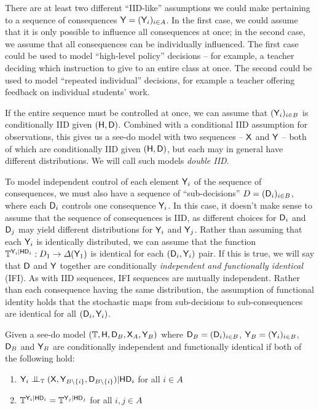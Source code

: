There are at least two different ``IID-like'' assumptions we could make pertaining to a sequence of consequences $\mathsf{Y}=(\mathsf{Y}_i)_{i\in A}$. In the first case, we could assume that it is only possible to influence all consequences at once; in the second case, we assume that all consequences can be individually influenced. The first case could be used to model ``high-level policy'' decisions -- for example, a teacher deciding which instruction to give to an entire class at once. The second could be used to model ``repeated individual'' decisions, for example a teacher offering feedback on individual students' work.

If the entire sequence must be controlled at once, we can assume that $(\mathsf{Y}_i)_{i\in B}$ is conditionally IID given $(\mathsf{H},\mathsf{D})$. Combined with a conditional IID assumption for observations, this gives us a see-do model with two sequences -- $\mathsf{X}$ and $\mathsf{Y}$ -- both of which are conditionally IID given $(\mathsf{H},\mathsf{D})$, but each may in general have different distributions. We will call such models \emph{double IID}.

To model independent control of each element $\mathsf{Y}_i$ of the sequence of consequences, we must also have a sequence of ``sub-decisions'' $D=(\mathsf{D}_i)_{i\in B}$, where each $\mathsf{D}_i$ controls one consequence $\mathsf{Y}_i$. In this case, it doesn't make sense to assume that the sequence of consequences is IID, as different choices for $\mathsf{D}_i$ and $\mathsf{D}_j$ may yield different distributions for $\mathsf{Y}_i$ and $\mathsf{Y}_j$. Rather than assuming that each $\mathsf{Y}_i$ is identically distributed, we can assume that the function $\mathbb{T}^{\mathsf{Y}_i|\mathsf{H}\mathsf{D}_i}:D_1\to \Delta(\mathsf{Y}_1)$ is identical for each $(\mathsf{D}_i,\mathsf{Y}_i)$ pair. If this is true, we will say that $\mathsf{D}$ and $\mathsf{Y}$ together are conditionally \emph{independent and functionally identical} (IFI). As with IID sequences, IFI sequences are mutually independent. Rather than each consequence having the same distribution, the assumption of functional identity holds that the stochastic maps from sub-decisions to sub-consequences are identical for all $(\mathsf{D}_i,\mathsf{Y}_i)$.

\begin{definition}
Given a see-do model $(\mathbb{T},\mathsf{H},\mathsf{D}_B,\mathsf{X}_A,\mathsf{Y}_B)$ where $\mathsf{D}_B=(\mathsf{D}_i)_{i\in B}$, $\mathsf{Y}_B=(\mathsf{Y}_i)_{i\in B}$, $\mathsf{D}_B$ and $\mathsf{Y}_B$ are conditionally independent and functionally identical if both of the following hold:
\begin{enumerate}
    \item $\RV{Y}_i\CI_{\kernel{T}} (\RV{X},\RV{Y}_{B\setminus \{i\}},\RV{D}_{B\setminus \{i\}})|\RV{H}\RV{D}_i$ for all $i\in A$
    \item $\mathbb{T}^{\mathsf{Y}_i|\mathsf{H}\mathsf{D}_i} = \mathbb{T}^{\mathsf{Y}_j|\mathsf{H}\mathsf{D}_j}$ for all $i,j\in A$
\end{enumerate}
\end{definition}

